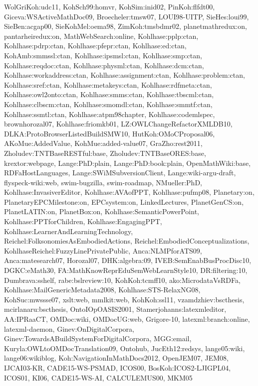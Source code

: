 {WolGriKoh:udc11,%
KohSch99:homvr,%
KohSim:inid02,%
PinKoh:flfdt00,%
Giceva:WSActiveMathDoc09,%
Broecheler:tmsw07,%
LOUI98-UITP,%
SieHes:loui99,%
SieBen:acgap00,%
SieKohMel:oema98,%
ZimKoh:tmsbdmr02,%
planetmathredux:on,%
pantarheiredux:on,%
MathWebSearch:online,%
Kohlhase:pplp:ctan,%
Kohlhase:pdrp:ctan,%
Kohlhase:pfepr:ctan,%
Kohlhase:ed:ctan,%
KohAmb:smmssl:ctan,%
Kohlhase:ipsmsl:ctan,%
Kohlhase:smp:ctan,%
Kohlhase:reqdoc:ctan,%
Kohlhase:physml:ctan,%
Kohlhase:dcm:ctan,%
Kohlhase:workaddress:ctan,%
Kohlhase:assignment:ctan,%
Kohlhase:problem:ctan,%
Kohlhase:sref:ctan,%
Kohlhase:metakeys:ctan,%
Kohlhase:rdfmeta:ctan,%
Kohlhase:owl2onto:ctan,%
Kohlhase:smms:ctan,%
Kohlhase:tbscml:ctan,%
Kohlhase:clbscm:ctan,%
Kohlhase:smomdl:ctan,%
Kohlhase:smmtf:ctan,%
Kohlhase:ssmtl:ctan,%
Kohlhase:atpm98chapter,%
Kohlhase:codemlspec,%
brownhorozal07,%
Kohlhase:friomkb01,%
LZ:OWLChangeRefactorXMLDB10,%
DLKA:ProtoBrowserListedBuildSMW10,%
HutKoh:OMoCProposal06,%
AKoMue:AddedValue,%
KohMue:added-value07,%
GraZho:rest2011,%
Zholudev:TNTBaseRESTful:base,%
Zholudev:TNTBaseORES:base,%
krextor:webpage,%
Lange:PhD:plain,%
Lange:PhD:book:plain,%
OpenMathWiki:base,%
RDFaHostLanguages,%
Lange:SWiMSubversionClient,%
Lange:wiki-argu-draft,%
flyspeck-wiki:web,%
swim-bugzilla,%
swim-roadmap,%
NMueller:PhD,%
Kohlhase:InvasiverEditor,%
Kohlhase:AVAofPPT,%
Kohlhase:pufmp08,%
Planetary:on,%
PlanetaryEPCMilestone:on,%
EPCsystem:on,%
LinkedLectures,%
PlanetGenCS:on,%
PlanetLATIN:on,%
PlanetBox:on,%
Kohlhase:SemanticPowerPoint,%
Kohlhase:PPTforChildren,%
Kohlhase:EngagingPPT,%
Kohlhase:LearnerAndLearningTechnology,%
Reichel:FolksonomiesAsEmbodiedActions,%
Reichel:EmbodiedConceptualizations,%
KohlhaseReichel:FuzzyLinePrivatePublic,%
Anca:NLMPforATS09,%
Anca:matesearch07,%
Horozal07,%
DHK:algebra:09,%
IVEB:SemEnabBusProcDisc10,%
DGKC:eMath30,%
FA:MathKnowReprEduSemWebLearnStyle10,%
DR:filtering:10,%
Dumbrava:sshelf,%
rabe:bslreview:10,%
KohKoh:tcmff10,%
ako:MicrodataVsRDFa,%
Kohlhase:MailGenericMetadata2008,%
Kohlhase:STS-RelaxNG08,%
KohSuc:mwssse07,%
xslt:web,%
mmlkit:web,%
KohKoh:ssl11,%
vzamdzhiev:bscthesis,%
mcirlanaru:bscthesis,%
OntoIOpOASIS2001,%
Stamerjohanns:latexmleditor,%
AA:IPRaaCT,%
OMDoc:wiki,%
OMDocUG:web,%
Grigore-10,%
latexml:branch:online,%
latexml-daemon,%
Ginev:OnDigitalCorpora,%
Ginev:TowardsABuildSystemForDigitalCorpora,%
MGG:email,%
Kuryla:OWLtoOMDocTranslation09,%
Ontohub,%
JucEth12:redsys,%
lange05:wiki,%
lange06:wikiblog,%
Koh:NavigationInMathDocs2012,%
OpenJEM07,%
JEM08,%
IJCAI03-KR,%
CADE15-WS-PSMAD,%
ICOS00,%
BosKoh:ICOS2-LJIGPL04,%
ICOS01,%
KI06,%
CADE15-WS-AI,%
CALCULEMUS00,%
MKM05%
}

